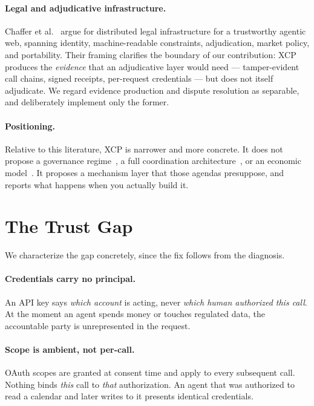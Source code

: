 \documentclass[11pt]{article}
\begin{document}
\paragraph{Legal and adjudicative infrastructure.}
Chaffer et al.~\cite{chaffer2026} argue for distributed legal infrastructure for
a trustworthy agentic web, spanning identity, machine-readable constraints,
adjudication, market policy, and portability. Their framing clarifies the
boundary of our contribution: XCP produces the \emph{evidence} that an
adjudicative layer would need --- tamper-evident call chains, signed receipts,
per-request credentials --- but does not itself adjudicate. We regard evidence
production and dispute resolution as separable, and deliberately implement only
the former.

\paragraph{Positioning.}
Relative to this literature, XCP is narrower and more concrete. It does not
propose a governance regime~\cite{pattison2026,chaffer2026}, a full coordination
architecture~\cite{zhu2026ioai}, or an economic model~\cite{yang2025}. It
proposes a mechanism layer that those agendas presuppose, and reports what
happens when you actually build it.

\section{The Trust Gap}

We characterize the gap concretely, since the fix follows from the diagnosis.

\paragraph{Credentials carry no principal.}
An API key says \emph{which account} is acting, never \emph{which human
authorized this call}. At the moment an agent spends money or touches regulated
data, the accountable party is unrepresented in the request.

\paragraph{Scope is ambient, not per-call.}
OAuth scopes are granted at consent time and apply to every subsequent call.
Nothing binds \emph{this} call to \emph{that} authorization. An agent that was
authorized to read a calendar and later writes to it presents identical
credentials.
\end{document}
